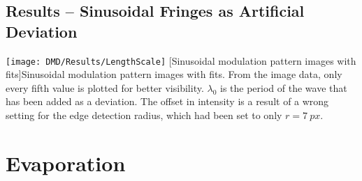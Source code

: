 \iffalse
\pagebreak
\subsection{Results -- Gaussian Peak as Artificial Deviation}
\vfill
\begin{minipage}{\linewidth}
    \centering
    \texttt{[image: DMD/Results/IntensityCut]}
    \captionof{figure}[Horizontal cuts at the centre through the resulting images with fits]{Horizontal cuts at the centre through the resulting images with fits. From the image data, only every tenth value is plotted for better visibility. $A_0$ is the amplitude of the gaussian peak that has been added as a deviation.}
    \label{fig:dmd_results_gaussian_cuts}
\end{minipage}
\vfill
\fi

\pagebreak
\subsection{Results -- Sinusoidal Fringes as Artificial Deviation}
\vfill
\begin{minipage}{\linewidth}
    \centering
    \texttt{[image: DMD/Results/LengthScale]}
    [Sinusoidal modulation pattern images with fits]{Sinusoidal modulation pattern images with fits. From the image data, only every fifth value is plotted for better visibility. $\lambda_0$ is the period of the wave that has been added as a deviation. The offset in intensity is a result of a wrong setting for the edge detection radius, which had been set to only $r=\SI{7}{px}$.}
    \label{fig:dmd_results_resolution_cuts}
\end{minipage}
\vfill
\pagebreak



\section{Evaporation}
